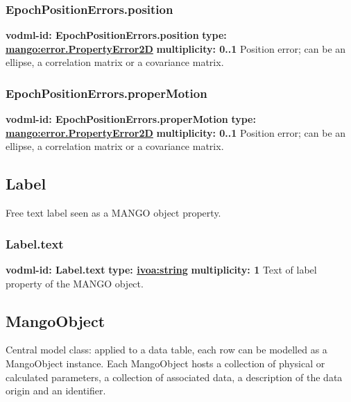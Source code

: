     \subsubsection{EpochPositionErrors.position}
      \textbf{vodml-id: EpochPositionErrors.position} \newline
      \textbf{type: \hyperref[sect:error.PropertyError2D]{mango:error.PropertyError2D}} \newline
      \textbf{multiplicity: 0..1} \newline 
      Position error; can be an ellipse, a correlation matrix or a covariance matrix.

    \subsubsection{EpochPositionErrors.properMotion}
      \textbf{vodml-id: EpochPositionErrors.properMotion} \newline
      \textbf{type: \hyperref[sect:error.PropertyError2D]{mango:error.PropertyError2D}} \newline
      \textbf{multiplicity: 0..1} \newline 
      Position error; can be an ellipse, a correlation matrix or a covariance matrix.

  \subsection{Label}
  \label{sect:Label}
    Free text label seen as a MANGO object property.

    \subsubsection{Label.text}
      \textbf{vodml-id: Label.text} \newline
      \textbf{type: \hyperref[sect:ivoa]{ivoa:string}} \newline
      \textbf{multiplicity: 1} \newline 
      Text of label property of the MANGO object.

  \subsection{MangoObject}
  \label{sect:MangoObject}
    Central model class: applied to a data table, each row can be modelled as a MangoObject instance. Each MangoObject hosts a collection of physical or calculated parameters, a collection of associated data, a description of the data origin and an identifier.

